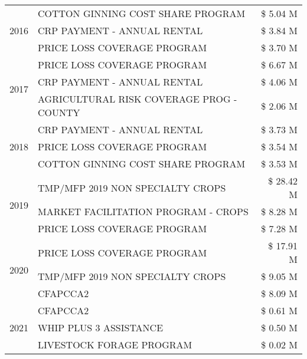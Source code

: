 \begin{tabular}{llr}
\cline{1-3}
\multirow[t]{3}{*}{2016} & COTTON GINNING COST SHARE PROGRAM & \$ 5.04 M \\
 & CRP PAYMENT - ANNUAL RENTAL & \$ 3.84 M \\
 & PRICE LOSS COVERAGE PROGRAM & \$ 3.70 M \\
\cline{1-3}
\multirow[t]{3}{*}{2017} & PRICE LOSS COVERAGE PROGRAM & \$ 6.67 M \\
 & CRP PAYMENT - ANNUAL RENTAL & \$ 4.06 M \\
 & AGRICULTURAL RISK COVERAGE PROG - COUNTY & \$ 2.06 M \\
\cline{1-3}
\multirow[t]{3}{*}{2018} & CRP PAYMENT - ANNUAL RENTAL & \$ 3.73 M \\
 & PRICE LOSS COVERAGE PROGRAM & \$ 3.54 M \\
 & COTTON GINNING COST SHARE PROGRAM & \$ 3.53 M \\
\cline{1-3}
\multirow[t]{3}{*}{2019} & TMP/MFP 2019 NON SPECIALTY CROPS & \$ 28.42 M \\
 & MARKET FACILITATION PROGRAM - CROPS & \$ 8.28 M \\
 & PRICE LOSS COVERAGE PROGRAM & \$ 7.28 M \\
\cline{1-3}
\multirow[t]{3}{*}{2020} & PRICE LOSS COVERAGE PROGRAM & \$ 17.91 M \\
 & TMP/MFP 2019 NON SPECIALTY CROPS & \$ 9.05 M \\
 & CFAPCCA2 & \$ 8.09 M \\
\cline{1-3}
\multirow[t]{3}{*}{2021} & CFAPCCA2 & \$ 0.61 M \\
 & WHIP PLUS 3 ASSISTANCE & \$ 0.50 M \\
 & LIVESTOCK FORAGE PROGRAM & \$ 0.02 M \\
\cline{1-3}
\bottomrule
\end{tabular}
